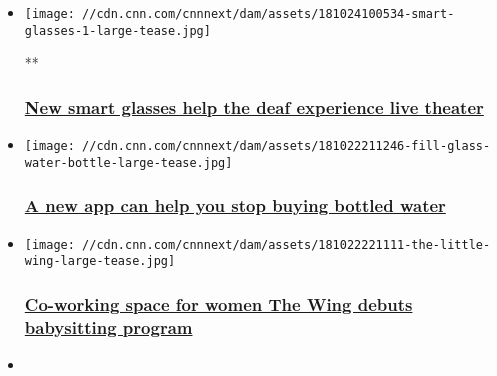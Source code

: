 \begin{itemize}
\item
  \href{/videos/business/2018/10/24/smart-glasses-lon-orig.cnn-business}{}

  \texttt{[image: //cdn.cnn.com/cnnnext/dam/assets/181024100534-smart-glasses-1-large-tease.jpg]}

  **

  \hypertarget{new-smart-glasses-help-the-deaf-experience-live-theater}{%
  \subsubsection{\texorpdfstring{\href{/videos/business/2018/10/24/smart-glasses-lon-orig.cnn-business}{New
  smart glasses help the deaf experience live
  theater}}{New smart glasses help the deaf experience live theater}}\label{new-smart-glasses-help-the-deaf-experience-live-theater}}
\item
  \href{/2018/10/23/tech/tap-water-startup/index.html}{}

  \texttt{[image: //cdn.cnn.com/cnnnext/dam/assets/181022211246-fill-glass-water-bottle-large-tease.jpg]}

  \hypertarget{a-new-app-can-help-you-stop-buying-bottled-water}{%
  \subsubsection{\texorpdfstring{\href{/2018/10/23/tech/tap-water-startup/index.html}{A
  new app can help you stop buying bottled
  water}}{A new app can help you stop buying bottled water}}\label{a-new-app-can-help-you-stop-buying-bottled-water}}
\item
  \href{/2018/10/23/tech/the-wing-daycare-service/index.html}{}

  \texttt{[image: //cdn.cnn.com/cnnnext/dam/assets/181022221111-the-little-wing-large-tease.jpg]}

  \hypertarget{co-working-space-for-women-the-wing-debuts-babysitting-program}{%
  \subsubsection{\texorpdfstring{\href{/2018/10/23/tech/the-wing-daycare-service/index.html}{Co-working
  space for women The Wing debuts babysitting
  program}}{Co-working space for women The Wing debuts babysitting program}}\label{co-working-space-for-women-the-wing-debuts-babysitting-program}}
\item
  \href{/videos/business/2018/10/16/robot-dog-spot-dancing.cnn-business}{}


\end{itemize}
